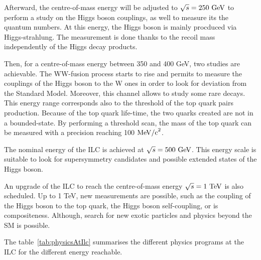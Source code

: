    Afterward, the centre-of-mass energy will be adjusted to $\sqrt{s} = 250~\rm{GeV}$ to perform a study on the Higgs boson couplings, as well to measure its the quantum numbers.
   At this energy, the Higgs boson is mainly procduced via Higgs-strahlung.
   The measurement is done thanks to the recoil mass independently of the Higgs decay products.
 
   Then, for a centre-of-mass energy between 350 and 400 GeV, two studies are achievable. 
   The WW-fusion process starts to rise and permits to measure the couplings of the Higgs boson to the W ones in order to look for deviation from the Standard Model. 
   Moreover, this channel allows to study some rare decays. 
   This energy range corresponds also to the threshold of the top quark pairs production.
   Because of the top quark life-time, the two quarks created are not in a bounded-state. 
   By performing a threshold scan, the mass of the top quark can be measured with a precision reaching 100 $\rm{MeV/c}^2$.

   The nominal energy of the \gls{ILC} is achieved at $\sqrt{s} = 500~\rm{GeV}$.
   This energy scale is suitable to look for supersymmetry candidates and possible extended states of the Higgs boson.

   An upgrade of the ILC to reach the centre-of-mass energy $\sqrt{s} = 1~\rm{TeV}$ is also scheduled.
   Up to 1 TeV, new measurements are possible, such as the coupling of the Higgs boson to the top quark, the Higgs boson self-coupling, or is compositeness.
   Although, search for new exotic particles and physics beyond the \gls{SM} is possible.
    
   The table~\ref{tab:physicsAtIlc} summarises the different physics programs at the \gls{ILC} for the different energy reachable.  

